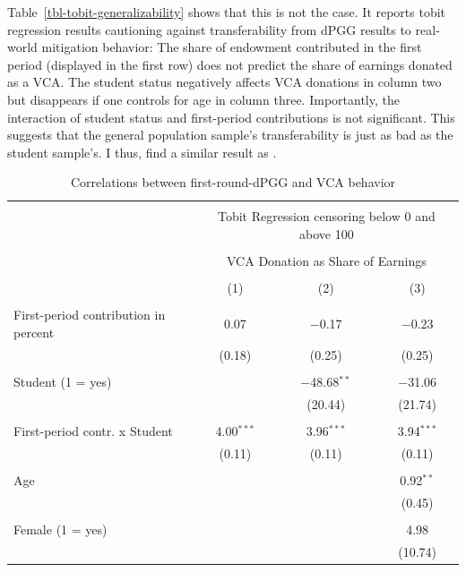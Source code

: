 \documentclass[
  authoryear,
  review,
  3p,
  onecolumn]{elsarticle}
\begin{document}
Table~\ref{tbl-tobit-generalizability} shows that this is not the case.
It reports tobit regression results cautioning against transferability
from dPGG results to real-world mitigation behavior: The share of
endowment contributed in the first period (displayed in the first row)
does not predict the share of earnings donated as a VCA. The student
status negatively affects VCA donations in column two but disappears if
one controls for age in column three. Importantly, the interaction of
student status and first-period contributions is not significant. This
suggests that the general population sample's transferability is just as
bad as the student sample's. I thus, find a similar result as
\citet[p.6]{GKLS2020}.

\hypertarget{tbl-tobit-generalizability}{}
\begin{table}[!htbp] \centering 
  \caption{\label{tbl-tobit-generalizability}Correlations between first-round-dPGG and VCA behavior } 
  \label{} 
\begin{tabular}{@{\extracolsep{5pt}}lccc} 
\\[-1.8ex]\hline 
\hline \\[-1.8ex] 
 & \multicolumn{3}{c}{Tobit Regression censoring below 0 and above 100} \\ 
\cline{2-4} 
\\[-1.8ex] & \multicolumn{3}{c}{VCA Donation as Share of Earnings} \\ 
\\[-1.8ex] & (1) & (2) & (3)\\ 
\hline \\[-1.8ex] 
 First-period contribution in percent & 0.07 & $-$0.17 & $-$0.23 \\ 
  & (0.18) & (0.25) & (0.25) \\ 
  & & & \\ 
 Student (1 = yes) &  & $-$48.68$^{**}$ & $-$31.06 \\ 
  &  & (20.44) & (21.74) \\ 
  & & & \\ 
 First-period contr. x Student & 4.00$^{***}$ & 3.96$^{***}$ & 3.94$^{***}$ \\ 
  & (0.11) & (0.11) & (0.11) \\ 
  & & & \\ 
 Age &  &  & 0.92$^{**}$ \\ 
  &  &  & (0.45) \\ 
  & & & \\ 
 Female (1 = yes) &  &  & 4.98 \\ 
  &  &  & (10.74) \\ 

\end{tabular}
\end{table}
\end{document}

